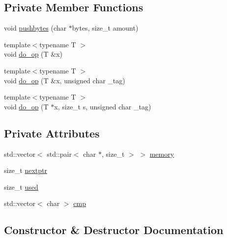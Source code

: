 \subsection*{Private Member Functions}
\begin{DoxyCompactItemize}
\item 
void \hyperlink{classgambatte_1_1loadsave__save_a5a57720d47f7b664ea19da4ea3b12e04}{pushbytes} (char $\ast$bytes, size\+\_\+t amount)
\item 
{\footnotesize template$<$typename T $>$ }\\void \hyperlink{classgambatte_1_1loadsave__save_a73997ef40fbe10d5bcdbb1a2cb49841c}{do\+\_\+op} (T \&x)
\item 
{\footnotesize template$<$typename T $>$ }\\void \hyperlink{classgambatte_1_1loadsave__save_ad41375ee1f0a3f60004868678227c23b}{do\+\_\+op} (T \&x, unsigned char \+\_\+tag)
\item 
{\footnotesize template$<$typename T $>$ }\\void \hyperlink{classgambatte_1_1loadsave__save_a454e46b0fb18f61513f1632afa2db806}{do\+\_\+op} (T $\ast$x, size\+\_\+t s, unsigned char \+\_\+tag)
\end{DoxyCompactItemize}
\subsection*{Private Attributes}
\begin{DoxyCompactItemize}
\item 
std\+::vector$<$ std\+::pair$<$ char $\ast$, size\+\_\+t $>$ $>$ \hyperlink{classgambatte_1_1loadsave__save_a3a7c1e5f98ab664b302f6b6b6f647e64}{memory}
\item 
size\+\_\+t \hyperlink{classgambatte_1_1loadsave__save_a2652324dd011ed7382ee9f04ad2e5b81}{nextptr}
\item 
size\+\_\+t \hyperlink{classgambatte_1_1loadsave__save_a1b2435871312e850b7eed8dc1955acd4}{used}
\item 
std\+::vector$<$ char $>$ \hyperlink{classgambatte_1_1loadsave__save_a3cb41d0129c7b9eb133931cbde7ea7b3}{cmp}
\end{DoxyCompactItemize}


\subsection{Constructor \& Destructor Documentation}
\mbox{\label{classgambatte_1_1loadsave__save_a20d59d77be9783899fa6bfaa05ba538d}} 

